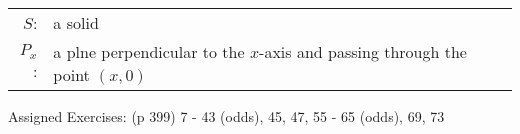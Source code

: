 \documentclass[12pt]{article}
\begin{document}
\begin{tabular}{rl}
$S$: & a solid \\
$P_x$: & a plne perpendicular to the $x$-axis and passing through the point $(x,0)$
\end{tabular}



\vfill


Assigned Exercises: (p 399) 7 - 43 (odds), 45, 47, 55 - 65 (odds), 69, 73
\end{document}
